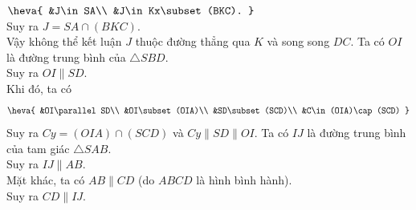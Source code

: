 \begin{ex}
{\begin{itemchoice}
			$\heva{ 
			 &J\in SA\\
			 &J\in Kx\subset(BKC).
			}$\\ 
			 Suy ra $J=SA\cap(BKC)$.\\
			Vậy không thể kết luận $J$ thuộc đường  thẳng qua $K$ và song song $DC$.
			\itemch Ta có $OI$ là đường trung bình  của $\triangle SBD$.\\
			Suy ra $OI\parallel  SD$.\\
			Khi  đó, ta có
			 \[\heva{
			&OI\parallel  SD\\
			 &OI\subset(OIA)\\
			 &SD\subset(SCD)\\
			&C\in(OIA)\cap(SCD) 
			}\] 
			Suy ra $Cy=(OIA)\cap(SCD)$ và $Cy\parallel SD\parallel OI$. 
			\itemch Ta có $IJ$ là đường trung bình của tam  giác $\triangle SAB$.\\
			Suy  ra $IJ\parallel AB$.\\
			Mặt khác, ta có  $AB\parallel CD$ (do $ABCD$ là hình bình hành).\\
			 Suy ra $CD\parallel IJ$.
		\end{itemchoice}
	 }
\end{ex}


